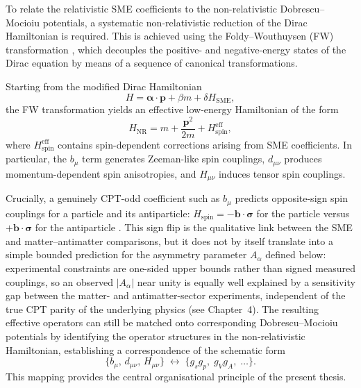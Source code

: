 \documentclass[main]{subfiles}
\begin{document}
To relate the relativistic SME coefficients to the non-relativistic
Dobrescu--Mocioiu potentials, a systematic non-relativistic reduction of the
Dirac Hamiltonian is required. This is achieved using the Foldy--Wouthuysen
(FW) transformation \cite{Foldy1950}, which decouples the positive- and
negative-energy states of the Dirac equation by means of a sequence of
canonical transformations.

Starting from the modified Dirac Hamiltonian
\begin{equation}
  H = \boldsymbol{\alpha}\cdot\mathbf{p} + \beta m + \delta H_{\mathrm{SME}},
\end{equation}
the FW transformation yields an effective low-energy Hamiltonian of the form
\begin{equation}
  H_{\mathrm{NR}}
  = m + \frac{\mathbf{p}^{2}}{2m} + H_{\mathrm{spin}}^{\mathrm{eff}},
\end{equation}
where $H_{\mathrm{spin}}^{\mathrm{eff}}$ contains spin-dependent corrections
arising from SME coefficients. In particular, the $b_{\mu}$ term generates
Zeeman-like spin couplings, $d_{\mu\nu}$ produces momentum-dependent spin
anisotropies, and $H_{\mu\nu}$ induces tensor spin couplings.

Crucially, a genuinely CPT-odd coefficient such as $b_{\mu}$ predicts opposite-sign
spin couplings for a particle and its antiparticle: $H_{\mathrm{spin}} =
-\mathbf{b}\cdot\boldsymbol{\sigma}$ for the particle versus
$+\mathbf{b}\cdot\boldsymbol{\sigma}$ for the antiparticle \cite{KosteleckyLane1999}.
This sign flip is the qualitative link between the SME and matter--antimatter
comparisons, but it does not by itself translate into a simple bounded prediction
for the asymmetry parameter $A_{\alpha}$ defined below: experimental constraints
are one-sided upper bounds rather than signed measured couplings, so an observed
$|A_{\alpha}|$ near unity is equally well explained by a sensitivity gap between
the matter- and antimatter-sector experiments, independent of the true CPT parity
of the underlying physics (see Chapter~4). The resulting effective operators can
still be matched onto corresponding
Dobrescu--Mocioiu potentials by identifying the operator structures in the
non-relativistic Hamiltonian, establishing a correspondence of the schematic
form
\begin{equation}
  \{b_{\mu},\, d_{\mu\nu},\, H_{\mu\nu}\}
  \;\longleftrightarrow\;
  \{g_{s}g_{p},\; g_{V}g_{A},\;\ldots\}.
\end{equation}
This mapping provides the central organisational principle of the present
thesis.
\end{document}
